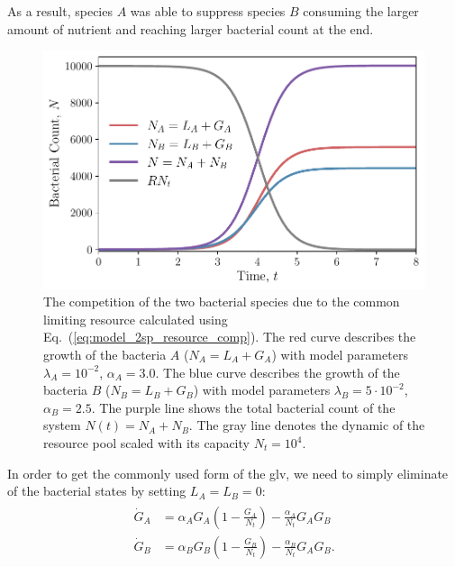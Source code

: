 \documentclass[10pt,A4paper]{article}
\numberwithin{equation}{section}
\begin{document}
As a result, species $A$ was able to suppress species $B$ consuming the larger amount of nutrient and reaching larger bacterial count at the end.
\begin{figure}[H]
    \begin{center}
    \includegraphics[width=0.9\columnwidth]{Figures/pool_model_2pools_resource_competition.pdf}
    \caption{
        The competition of the two bacterial species due to the common limiting resource calculated using Eq.~(\ref{eq:model_2sp_resource_comp}).
        The red curve describes the growth of the bacteria $A$ ($N_A = L_A+G_A$) with model parameters $\lambda_A=10^{-2}$, $\alpha_A=3.0$.
        The blue curve describes the growth of the bacteria $B$ ($N_B = L_B+G_B$) with model parameters $\lambda_B=5\cdot 10^{-2}$, $\alpha_B=2.5$.
        The purple line shows the total bacterial count of the system  $N(t)=N_A+N_B$.
        The gray line denotes the dynamic of the resource pool scaled with its capacity $N_t=10^4$.
    }
    \label{fig:2pool_resource_2sp}
    \end{center}
\end{figure}
%
In order to get the commonly used form of the \ac{glv}, we need to simply eliminate of the bacterial states by setting $L_A=L_B=0$:
\begin{align}
    \begin{split}
        \dot{G}_A &= \alpha_A G_A\left(1 - \frac{G_A}{N_t}\right) - \frac{\alpha_A}{N_t}G_AG_B\\
        \dot{G}_B &= \alpha_B G_B\left(1-\frac{G_B}{N_t}\right) -\frac{\alpha_B}{N_t}G_AG_B. 
    \label{eq:LV_simple}
    \end{split}
\end{align}
\end{document}

